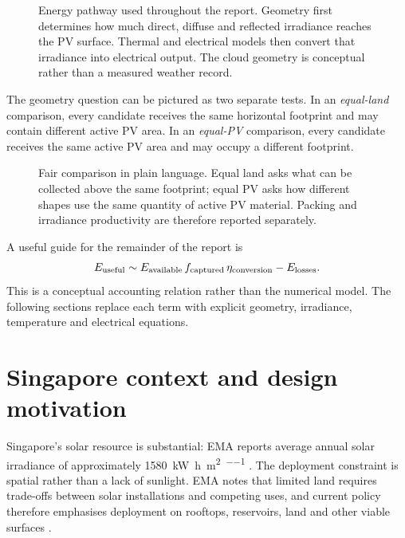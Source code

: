 \documentclass[11pt,a4paper]{article}
\begin{document}
\begin{figure}[htbp]
\centering

\caption{Energy pathway used throughout the report. Geometry first determines how much direct, diffuse and reflected irradiance reaches the PV surface. Thermal and electrical models then convert that irradiance into electrical output. The cloud geometry is conceptual rather than a measured weather record.}
\label{fig:solar-pv-beginner}
\end{figure}

The geometry question can be pictured as two separate tests. In an \emph{equal-land} comparison, every candidate receives the same horizontal footprint and may contain different active PV area. In an \emph{equal-PV} comparison, every candidate receives the same active PV area and may occupy a different footprint.

\begin{figure}[htbp]
\centering

\caption{Fair comparison in plain language. Equal land asks what can be collected above the same footprint; equal PV asks how different shapes use the same quantity of active PV material. Packing and irradiance productivity are therefore reported separately.}
\label{fig:fair-comparison-beginner}
\end{figure}

A useful guide for the remainder of the report is
\begin{equation}
E_{\rm useful}\sim E_{\rm available}\,f_{\rm captured}\,\eta_{\rm conversion}-E_{\rm losses}.
\label{eq:beginner-energy-chain}
\end{equation}
This is a conceptual accounting relation rather than the numerical model. The following sections replace each term with explicit geometry, irradiance, temperature and electrical equations.

\section{Singapore context and design motivation}
Singapore's solar resource is substantial: EMA reports average annual solar irradiance of approximately \SI{1580}{\kilo\watt\hour\per\metre\squared\per\year} \cite{ema_solar_2026}. The deployment constraint is spatial rather than a lack of sunlight. EMA notes that limited land requires trade-offs between solar installations and competing uses, and current policy therefore emphasises deployment on rooftops, reservoirs, land and other viable surfaces \cite{ema_solar_2026,ema_target_2026}.
\end{document}
